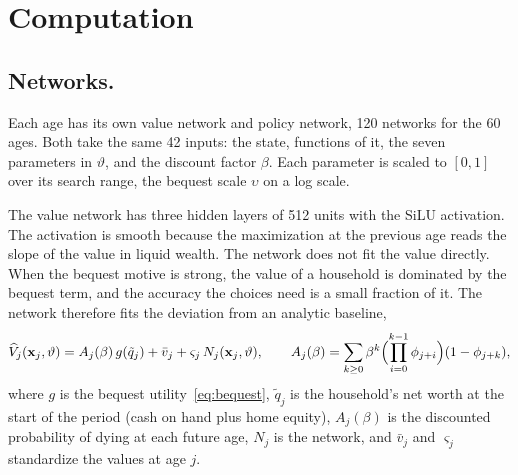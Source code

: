 \section{Computation}\label{app:computation}

\subsection{Networks.}\label{app:computation-networks}
Each age has its own value network and policy network, 120 networks for the
60 ages. Both take the same 42 inputs: the state, functions of it, the
seven parameters in $\vartheta$, and the discount factor $\beta$. Each parameter is scaled to $[0,1]$ over its
search range, the bequest scale $\upsilon$ on a log scale.

The value network has three hidden layers of 512 units with the SiLU
activation. The activation is smooth because the maximization at the
previous age reads the slope of the value in liquid wealth. The network does
not fit the value directly. When the bequest motive is strong, the value of
a household is dominated by the bequest term, and the accuracy the choices
need is a small fraction of it. The network therefore fits the deviation
from an analytic baseline,
\begin{equation*}
  \widehat V_j(\mathbf x_j,\vartheta)=A_j(\beta)\,g(\tilde q_j)
  +\bar v_j+\varsigma_j\,N_j(\mathbf x_j,\vartheta),
  \qquad
  A_j(\beta)=\sum_{k\geq0}\beta^k\Bigl(\prod_{i=0}^{k-1}\phi_{j+i}\Bigr)
  (1-\phi_{j+k}),
\end{equation*}
where $g$ is the bequest utility~\eqref{eq:bequest}, $\tilde q_j$ is the
household's net worth at the start of the period (cash on hand plus home
equity), $A_j(\beta)$ is the discounted probability of dying at each future
age, $N_j$ is the network, and $\bar v_j$ and $\varsigma_j$ standardize the values at
age $j$.

